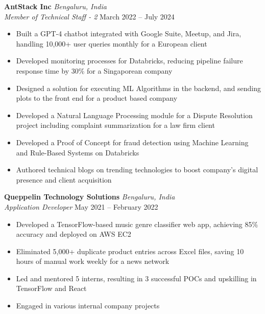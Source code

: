 \documentclass[11pt,a4paper]{article}
\begin{document}
\vspace{1em}
\noindent\textbf{AntStack Inc} \hfill \textit{Bengaluru, India}\\
\textit{Member of Technical Staff - 2} \hfill March 2022 – July 2024
\begin{itemize}[noitemsep,topsep=2pt]
    \item Built a GPT-4 chatbot integrated with Google Suite, Meetup, and Jira, handling 10,000+ user queries monthly for a European client
    \item Developed monitoring processes for Databricks, reducing pipeline failure response time by 30\% for a Singaporean company
    \item Designed a solution for executing ML Algorithms in the backend, and sending plots to the front end for a product based company
    \item Developed a Natural Language Processing module for a Dispute Resolution project including complaint summarization for a law firm client
    \item Developed a Proof of Concept for fraud detection using Machine Learning and Rule-Based Systems on Databricks
    \item Authored technical blogs on trending technologies to boost company's digital presence and client acquisition
\end{itemize}
\vspace{-0.3em}

\vspace{1em}
\noindent\textbf{Queppelin Technology Solutions} \hfill \textit{Bengaluru, India}\\
\textit{Application Developer} \hfill May 2021 – February 2022
\begin{itemize}[noitemsep,topsep=2pt]
    \item Developed a TensorFlow-based music genre classifier web app, achieving 85\% accuracy and deployed on AWS EC2
    \item Eliminated 5,000+ duplicate product entries across Excel files, saving 10 hours of manual work weekly for a news network
    \item Led and mentored 5 interns, resulting in 3 successful POCs and upskilling in TensorFlow and React
    \item Engaged in various internal company projects
\end{itemize}
\vspace{-0.3em}
\end{document}
